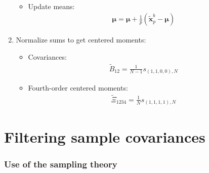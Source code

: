 \documentclass[12pt]{scrartcl}
\begin{document}
\begin{enumerate}
\begin{itemize}
\begin{align}
\end{align}
\item Update means:
\begin{align}
\boldsymbol{\mu} = \boldsymbol{\mu} + \frac{1}{p} \left(\widetilde{\mathbf{x}}^b_p - \boldsymbol{\mu}\right)
\end{align}
\end{itemize}
\item Normalize sums to get centered moments:
\begin{itemize}
\item Covariances:
\begin{align}
\widetilde{B}_{12} = \frac{1}{N-1} s_{(1,1,0,0),N}
\end{align}
\item Fourth-order centered moments:
\begin{align}
\widetilde{\Xi}_{1234} = \frac{1}{N} s_{(1,1,1,1),N}
\end{align}
\end{itemize}
\end{enumerate}

\clearpage

\part{Filtering sample covariances}

\section{Use of the sampling theory}
\end{document}
